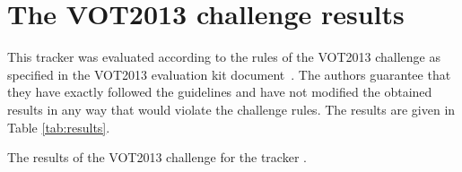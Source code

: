 \documentclass[10pt,oneside]{article}
\begin{document}
\section{The VOT2013 challenge results}
This tracker was evaluated according to the rules of the VOT2013 challenge
as specified in the VOT2013 evaluation kit document~\cite{VOT2013}.
The authors guarantee that they have exactly followed the guidelines
and have not modified the obtained results in any way that would violate the challenge rules.
The results are given in Table \ref{tab:results}.

\begin{table}
  \caption{The results of the VOT2013 challenge for the tracker
    .}
  \label{tab:results}

\end{table}
{\small
  
  
}
\end{document}
